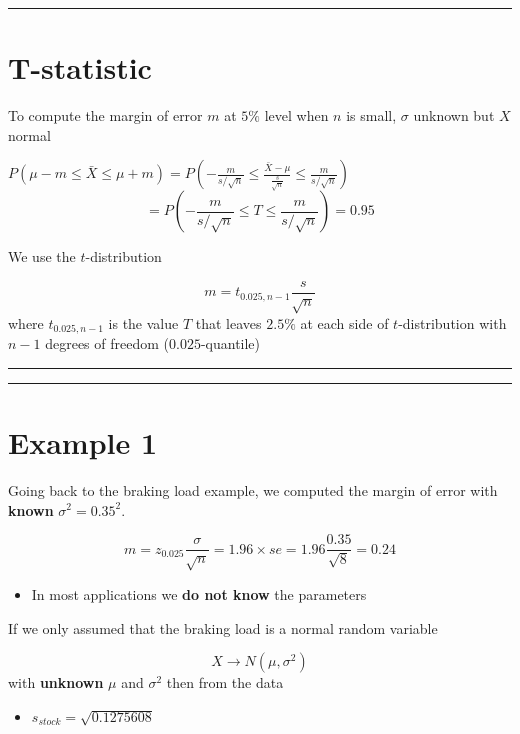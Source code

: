 \documentclass[
]{book}
\providecommand{\tightlist}{%
  \setlength{\itemsep}{0pt}\setlength{\parskip}{0pt}}
\begin{document}
\begin{center}\rule{0.5\linewidth}{0.5pt}\end{center}

\hypertarget{t-statistic-2}{%
\section{T-statistic}\label{t-statistic-2}}

To compute the margin of error \(m\) at \(5\%\) level when \(n\) is small, \(\sigma\) unknown but \(X\) normal

\(P(\mu-m \leq \bar{X} \leq\mu + m)=P(-\frac{m}{s/\sqrt{n}} \leq \frac{\bar{X}-\mu}{\frac{s}{\sqrt{n}}} \leq\frac{m}{s/\sqrt{n}})\)
\[=P(-\frac{m}{s/\sqrt{n}} \leq T \leq\frac{m}{s/\sqrt{n}})=0.95\]

We use the \(t\)-distribution

\[m=t_{0.025, n-1} \frac{s}{\sqrt{n}}\]
where \(t_{0.025, n-1}\) is the value \(T\) that leaves \(2.5\%\) at each side of \(t\)-distribution with \(n-1\) degrees of freedom (\(0.025\)-quantile)

\begin{center}\rule{0.5\linewidth}{0.5pt}\end{center}

\begin{center}\rule{0.5\linewidth}{0.5pt}\end{center}

\hypertarget{example-1-3}{%
\section{Example 1}\label{example-1-3}}

Going back to the braking load example, we computed the margin of error with \textbf{known} \(\sigma^2=0.35^2\).

\[m=z_{0.025} \frac{\sigma}{\sqrt{n}}=1.96\times se=1.96\frac{0.35}{\sqrt{8}}=0.24\]

\begin{itemize}
\tightlist
\item
  In most applications we \textbf{do not know} the parameters
\end{itemize}

If we only assumed that the braking load is a normal random variable

\[X \rightarrow N(\mu, \sigma^2)\]
with \textbf{unknown} \(\mu\) and \(\sigma^2\) then from the data

\begin{itemize}
\tightlist
\item
  \(s_{stock}=\sqrt{0.1275608}\)
\end{itemize}
\end{document}

